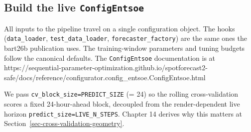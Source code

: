 \documentclass[
  english,
  letterpaper,
]{scrbook}
\begin{document}
\subsection{\texorpdfstring{Build the live
\texttt{ConfigEntsoe}}{Build the live ConfigEntsoe}}\label{sec-live-config}

All inputs to the pipeline travel on a single configuration object. The
hooks (\texttt{data\_loader}, \texttt{test\_data\_loader},
\texttt{forecaster\_factory}) are the same ones the bart26b publication
uses. The training-window parameters and tuning budgets follow the
canonical defaults. The \texttt{ConfigEntsoe} documentation is at
https://sequential-parameter-optimization.github.io/spotforecast2-safe/docs/reference/configurator.config\_entsoe.ConfigEntsoe.html

We pass \texttt{cv\_block\_size=PREDICT\_SIZE} (= 24) so the rolling
cross-validation scores a fixed 24-hour-ahead block, decoupled from the
render-dependent live horizon \texttt{predict\_size=LIVE\_N\_STEPS}.
Chapter 14 derives why this matters at
Section~\ref{sec-cross-validation-geometry}.
\end{document}
